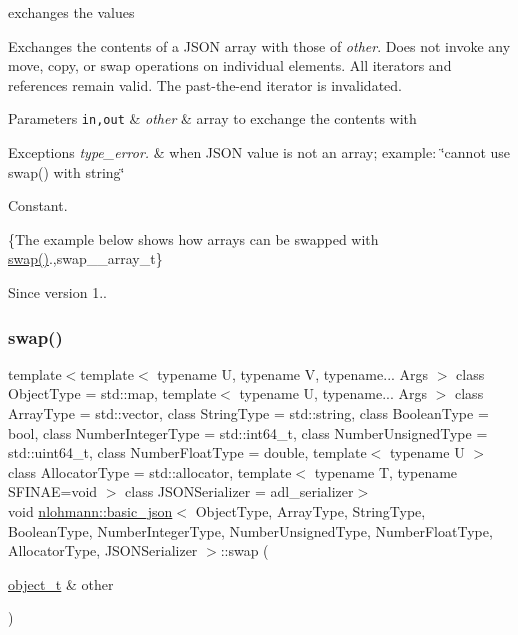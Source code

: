 exchanges the values 

Exchanges the contents of a J\+S\+ON array with those of {\itshape other}. Does not invoke any move, copy, or swap operations on individual elements. All iterators and references remain valid. The past-\/the-\/end iterator is invalidated.


\begin{DoxyParams}[1]{Parameters}
\mbox{\tt in,out}  & {\em other} & array to exchange the contents with\\
\hline
\end{DoxyParams}

\begin{DoxyExceptions}{Exceptions}
{\em type\+\_\+error.} & when J\+S\+ON value is not an array; example\+: {\ttfamily \char`\"{}cannot
use swap() with string\char`\"{}}\\
\hline
\end{DoxyExceptions}
Constant.

\{The example below shows how arrays can be swapped with {\ttfamily \mbox{\hyperlink{classnlohmann_1_1basic__json_a8c9d932353e1ab98a7dc2fc27e002031}{swap()}}}.,swap\+\_\+\+\_\+array\+\_\+t\}

\begin{DoxySince}{Since}
version 1.. 
\end{DoxySince}
\mbox{\label{classnlohmann_1_1basic__json_ac31f12587d2f1a3be5ffc394aa9d72a4}} 
\subsubsection{\texorpdfstring{swap()}{swap()}\hspace{0.1cm}{\footnotesize\ttfamily [3/4]}}
{\footnotesize\ttfamily template$<$template$<$ typename U, typename V, typename... Args $>$ class Object\+Type = std\+::map, template$<$ typename U, typename... Args $>$ class Array\+Type = std\+::vector, class String\+Type  = std\+::string, class Boolean\+Type  = bool, class Number\+Integer\+Type  = std\+::int64\+\_\+t, class Number\+Unsigned\+Type  = std\+::uint64\+\_\+t, class Number\+Float\+Type  = double, template$<$ typename U $>$ class Allocator\+Type = std\+::allocator, template$<$ typename T, typename S\+F\+I\+N\+A\+E=void $>$ class J\+S\+O\+N\+Serializer = adl\+\_\+serializer$>$ \\
void \mbox{\hyperlink{classnlohmann_1_1basic__json}{nlohmann\+::basic\+\_\+json}}$<$ Object\+Type, Array\+Type, String\+Type, Boolean\+Type, Number\+Integer\+Type, Number\+Unsigned\+Type, Number\+Float\+Type, Allocator\+Type, J\+S\+O\+N\+Serializer $>$\+::swap (\begin{DoxyParamCaption}\item[{\mbox{\hyperlink{classnlohmann_1_1basic__json_a5e48a7893520e1314bf0c9723e26ea2a}{object\+\_\+t}} \&}]{other }\end{DoxyParamCaption})\hspace{0.3cm}{\ttfamily [inline]}}




